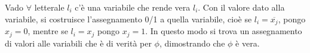 \begin{enumerate}
    Vado $\forall$ letterale $l_i$ c’è una variabile che rende vera $l_i$. Con il valore dato alla variabile, si costruisce l’assegnamento 0/1 a quella variabile, cioè se $l_i=\overline{x_j}$, pongo $x_j = 0$, mentre se $l_i = x_j$ pongo $x_j = 1$. In questo modo si trova un assegnamento di valori alle variabili che è di verità per $\phi$, dimostrando che $\phi$ è vera.
\end{enumerate}
